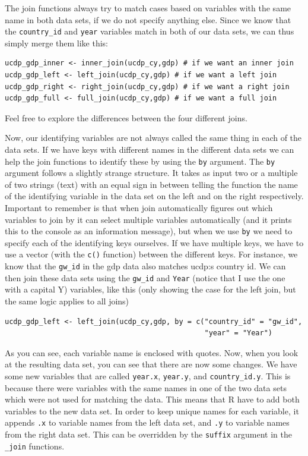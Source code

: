 \documentclass[
]{book}
\begin{document}
The join functions always try to match cases based on variables with the same name in both data sets, if we do not specify anything else. Since we know that the \texttt{country\_id} and \texttt{year} variables match in both of our data sets, we can thus simply merge them like this:

\begin{verbatim}
ucdp_gdp_inner <- inner_join(ucdp_cy,gdp) # if we want an inner join
ucdp_gdp_left <- left_join(ucdp_cy,gdp) # if we want a left join
ucdp_gdp_right <- right_join(ucdp_cy,gdp) # if we want a right join
ucdp_gdp_full <- full_join(ucdp_cy,gdp) # if we want a full join
\end{verbatim}

Feel free to explore the differences between the four different joins.

Now, our identifying variables are not always called the same thing in each of the data sets. If we have keys with different names in the different data sets we can help the join functions to identify these by using the \texttt{by} argument. The \texttt{by} argument follows a slightly strange structure. It takes as input two or a multiple of two strings (text) with an equal sign in between telling the function the name of the identifying variable in the data set on the left and on the right respectively. Important to remember is that when join automatically figures out which variables to join by it can select multiple variables automatically (and it prints this to the console as an information message), but when we use \texttt{by} we need to specify each of the identifying keys ourselves. If we have multiple keys, we have to use a vector (with the \texttt{c()} function) between the different keys. For instance, we know that the \texttt{gw\_id} in the gdp data also matches ucdp:s country id. We can then join these data sets using the \texttt{gw\_id} and \texttt{Year} (notice that I use the one with a capital Y) variables, like this (only showing the case for the left join, but the same logic applies to all joins)

\begin{verbatim}
ucdp_gdp_left <- left_join(ucdp_cy,gdp, by = c("country_id" = "gw_id",
                                               "year" = "Year")
\end{verbatim}

As you can see, each variable name is enclosed with quotes. Now, when you look at the resulting data set, you can see that there are now some changes. We have some new variables that are called \texttt{year.x}, \texttt{year.y}, and \texttt{country\_id.y}. This is because there were variables with the same names in one of the two data sets which were not used for matching the data. This means that R have to add both variables to the new data set. In order to keep unique names for each variable, it appends \texttt{.x} to variable names from the left data set, and \texttt{.y} to variable names from the right data set. This can be overridden by the \texttt{suffix} argument in the \texttt{\_join} functions.
\end{document}
